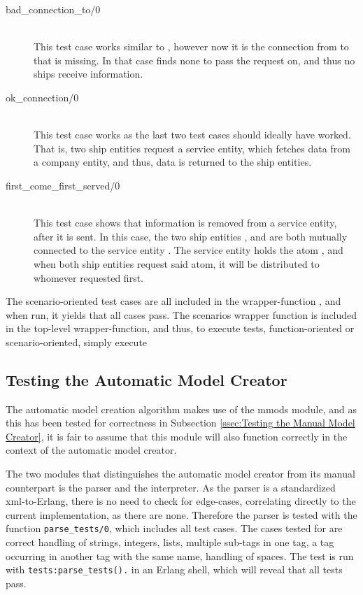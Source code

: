 \begin{description}
  \item[{bad\_connection\_to/0}]\ \\
    This test case works similar to , however now it is the connection from  to  that is missing. In that case  finds none to pass the request on, and thus no ships receive information.
  \item[{ok\_connection/0}]\ \\
    This test case works as the last two test cases should ideally have worked. That is, two ship entities request a service entity, which fetches data from a company entity, and thus, data is returned to the ship entities.
  \item[{first\_come\_first\_served/0}]\ \\
    This test case shows that information is removed from a service entity, after it is sent. In this case, the two ship entities , and  are both mutually connected to the service entity . The service entity holds the atom , and when both ship entities request said atom, it will be distributed to whomever requested first. 
\end{description}

The scenario-oriented test cases are all included in the wrapper-function , and when run, it yields that all cases pass. The scenarios wrapper function is included in the top-level wrapper-function, and thus, to execute  tests, function-oriented or scenario-oriented, simply execute 

\subsection{Testing the Automatic Model Creator}

The automatic model creation algorithm makes use of the mmods module, and as this has been tested for correctness in Subsection \ref{ssec:Testing the Manual Model Creator}, it is fair to assume that this module will also function correctly in the context of the automatic model creator. 

The two modules that distinguishes the automatic model creator from its manual counterpart is the parser and the interpreter. As the parser is a standardized xml-to-Erlang, there is no need to check for edge-cases, correlating directly to the current implementation, as there are none. Therefore the parser is tested with the function \lstinline{parse_tests/0}, which includes all test cases. The cases tested for are correct handling of strings, integers, lists, multiple sub-tags in one tag, a tag occurring in another tag with the same name, handling of spaces. The test is run with \lstinline{tests:parse_tests().} in an Erlang shell, which will reveal that all tests pass.

